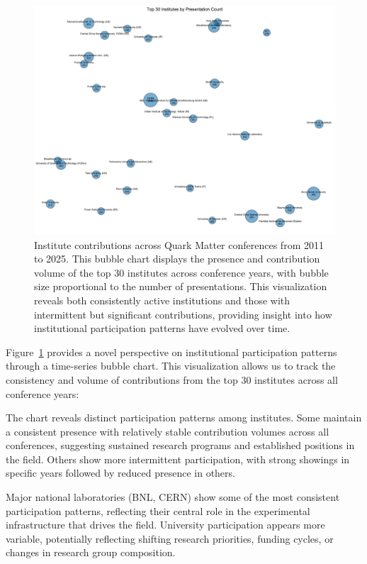 \documentclass[a4paper,11pt]{article}
\begin{document}
\begin{figure}[H]
\centering
\includegraphics[width=\textwidth]{figures/institute_bubble_chart.pdf}
\caption{Institute contributions across Quark Matter conferences from 2011 to 2025. This bubble chart displays the presence and contribution volume of the top 30 institutes across conference years, with bubble size proportional to the number of presentations. This visualization reveals both consistently active institutions and those with intermittent but significant contributions, providing insight into how institutional participation patterns have evolved over time.}
\label{fig:institute_bubble}
\end{figure}

Figure~\ref{fig:institute_bubble} provides a novel perspective on institutional participation patterns through a time-series bubble chart. This visualization allows us to track the consistency and volume of contributions from the top 30 institutes across all conference years:

The chart reveals distinct participation patterns among institutes. Some maintain a consistent presence with relatively stable contribution volumes across all conferences, suggesting sustained research programs and established positions in the field. Others show more intermittent participation, with strong showings in specific years followed by reduced presence in others.

Major national laboratories (BNL, CERN) show some of the most consistent participation patterns, reflecting their central role in the experimental infrastructure that drives the field. University participation appears more variable, potentially reflecting shifting research priorities, funding cycles, or changes in research group composition.
\end{document}
